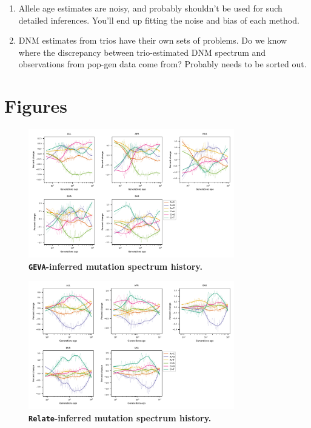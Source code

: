 \documentclass[]{article}
\begin{document}
\begin{enumerate}
    \item Allele age estimates are noisy, and probably shouldn't be used
        for such detailed inferences. You'll end up fitting the noise and
        bias of each method.
    \item DNM estimates from trios have their own sets of problems. Do we
        know where the discrepancy between trio-estimated DNM spectrum and
        observations from pop-gen data come from? Probably needs to be
        sorted out.
\end{enumerate}

\break

\section{Figures}

\begin{figure}[ht!]
    \centering
    \includegraphics[width=0.8\textwidth]{../plots/spectrum_history.geva.max_age.10000.pdf}
    \caption{
        \textbf{\texttt{GEVA}-inferred mutation spectrum history.}
    }
    \label{fig:geva-spectra}
\end{figure}

\begin{figure}[ht!]
    \centering
    \includegraphics[width=0.8\textwidth]{../plots/spectrum_history.relate.max_age.10000.pdf}
    \caption{
        \textbf{\texttt{Relate}-inferred mutation spectrum history.}
    }
    \label{fig:relate-spectra}
\end{figure}
\end{document}
